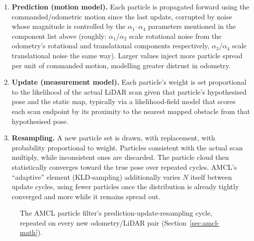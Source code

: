 \begin{enumerate}
  \item \textbf{Prediction (motion model).} Each particle is
    propagated forward using the commanded/odometric motion since the
    last update, corrupted by noise whose magnitude is controlled by
    the $\alpha_1$--$\alpha_4$ parameters mentioned in the component
    list above (roughly: $\alpha_1$/$\alpha_2$ scale rotational noise
    from the odometry's rotational and translational components
    respectively, $\alpha_3$/$\alpha_4$ scale translational noise the
    same way). Larger values inject more particle spread per unit of
    commanded motion, modelling greater distrust in odometry.
  \item \textbf{Update (measurement model).} Each particle's weight
    is set proportional to the likelihood of the actual LiDAR scan
    given that particle's hypothesised pose and the static map,
    typically via a likelihood-field model that scores each scan
    endpoint by its proximity to the nearest mapped obstacle from that
    hypothesised pose.
  \item \textbf{Resampling.} A new particle set is drawn, with
    replacement, with probability proportional to weight. Particles
    consistent with the actual scan multiply, while inconsistent ones
    are discarded. The particle cloud then statistically converges
    toward the true pose over repeated cycles. AMCL's ``adaptive'' element
    (KLD-sampling) additionally varies $N$ itself between update
    cycles, using fewer particles once the distribution is already
    tightly converged and more while it remains spread out.
\end{enumerate}

\begin{figure}[htbp]
  \centering
  \caption{The AMCL particle filter's prediction-update-resampling cycle, repeated on every new odometry/LiDAR pair (Section~\ref{sec:amcl-math}).}
  \label{fig:amcl-cycle}
\end{figure}

